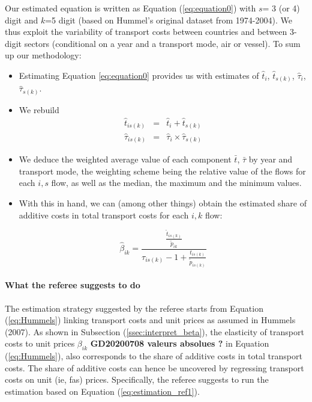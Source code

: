 \documentclass[a4paper,12pt]{article}
\begin{document}
Our estimated equation is written as Equation (\ref{eq:equation0}) with $s$= 3 (or 4) digit and $k$=5 digit (based on Hummel's original dataset from 1974-2004). We thus exploit the variability of transport costs between countries and between 3-digit sectors (conditional on a year and a transport mode, air or vessel). To sum up our methodology:
\begin{itemize}
\item Estimating Equation \ref{eq:equation0} provides us with estimates of $\hat{t}_i$, $\hat{t}_{s(k)}$, $\hat{\tau}_i$, $\hat{\tau}_{s(k)}$.
\item We rebuild
\begin{eqnarray*}
\hat{t}_{is(k)} &= &\hat{t}_{i}+\hat{t}_{s(k)} \\
\hat{\tau}_{is(k)} &= & \hat{\tau}_{i}\times\hat{\tau}_{s(k)}
\end{eqnarray*}
\item We deduce the weighted average value of each component $\bar{t}$, $\bar{\tau}$ by year and transport mode, the weighting scheme being the relative value of the flows for each $i,s$ flow, as well as the median, the maximum and the minimum values.
\item With this in hand, we can (among other things) obtain the estimated share of additive costs in total transport costs for each $i,k$ flow:


$$\hat{\beta}_{ik} = \frac{\frac{\hat{t}_{is(k)}}{\tilde{p}_{ik}}}{\tau_{is(k)}-1 + \frac{t_{is(k)}}{\tilde{p}_{is(k)}}} $$
\end{itemize}

\paragraph{What the referee suggests to do}

The estimation strategy suggested by the referee starts from Equation (\ref{eq:Hummels}) linking transport costs and unit prices as assumed in Hummels (2007). As shown in Subsection (\ref{ssec:interpret_beta}), the elasticity of transport costs to unit prices $\beta_{ik}$ \textbf{GD20200708 valeurs absolues ?} in Equation (\ref{eq:Hummels}), also corresponds to the share of additive costs in total transport costs. The share of additive costs can hence be uncovered by regressing transport costs on unit (ie, fas) prices. Specifically, the referee suggests to run the estimation based on Equation (\ref{eq:estimation_ref1}).
\end{document}
